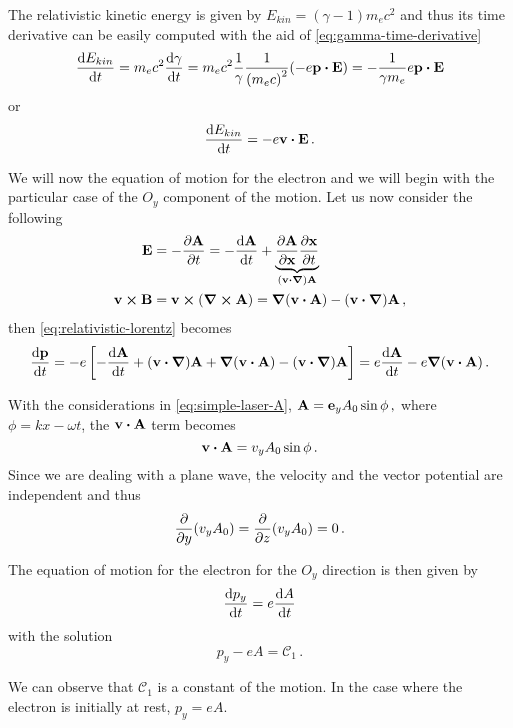 \documentclass[12pt, class=report, crop=false]{standalone}
\begin{document}
The relativistic kinetic energy is given by \(E_{kin}=(\gamma-1)m_e c^2\) and
thus its time derivative can be easily computed with the aid of
\cref{eq:gamma-time-derivative}
\[
\dv{E_{kin}}{t} = m_e c^2 \dv{\gamma}{t} =
m_e c^2 \frac{1}{\gamma} \frac{1}{{(m_e c)}^2} (-e\vb{p}\vdot\vb{E}) =
-\frac{1}{\gamma m_e} e \vb{p}\vdot\vb{E}
\]
or
\begin{equation}
  \label{eq:e-kin-deriv}
  \dv{E_{kin}}{t} = -e \vb{v}\vdot\vb{E}\,.
\end{equation}


We will now the equation of motion for the electron and we will begin with the
particular case of the \(O_y\) component of the motion.
Let us now consider the following
\[
\begin{aligned}
  \vb{E} &= -\pdv{\vb{A}}{t} = -\dv{\vb{A}}{t} +
    \underbrace{\pdv{\vb{A}}{\vb{x}}\pdv{\vb{x}}{t}}_{\left(\vb{v}\vdot\vb*{\nabla}\right)\vb{A}} \\
  \vb{v}\cp\vb{B} &= \vb{v} \cp (\curl{\vb{A}}) = \grad{(\vb{v}\vdot\vb{A})} - (\vb{v}\vdot\vb*{\nabla})\vb{A}\,,
\end{aligned}
\]
then \cref{eq:relativistic-lorentz} becomes
\[
\dv{\vb{p}}{t} = -e \left[-\dv{\vb{A}}{t}+(\vb{v}\vdot\vb*{\nabla})\vb{A}+
  \grad{(\vb{v}\vdot\vb{A})}-(\vb{v}\vdot\vb*{\nabla})\vb{A}\right]=
e\dv{\vb{A}}{t}-e\grad{(\vb{v}\vdot\vb{A})}\,.
\]

With the considerations in \cref{eq:simple-laser-A},
\(
\vb{A} = \vb{e}_y A_0 \sin{\phi}\,,
\)
where \(\phi=kx-\omega t\), the \(\vb{v}\vdot\vb{A}\) term becomes
\[
\vb{v}\vdot\vb{A} = v_y A_0 \sin{\phi}\,.
\]
Since we are dealing with a plane wave, the velocity and the vector potential
are independent and thus
\[
\pdv{y}(v_y A_0) = \pdv{z}(v_y A_0) = 0\,.
\]

The equation of motion for the electron for the \(O_y\) direction is then given by
\[
\dv{p_y}{t} = e \dv{A}{t}
\]
with the solution
\begin{equation}
  \label{eq:py-C1}
  p_y - eA = \mathcal{C}_1\,.
\end{equation}

We can observe that \(\mathcal{C}_1\) is a constant of the motion. In the case where
the electron is initially at rest, \(p_y=eA\).
\end{document}
